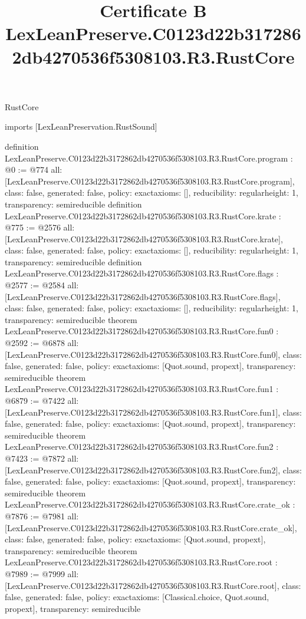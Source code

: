 \begin{lexlean}{RustCore}
\title{Certificate B LexLeanPreserve.C0123d22b3172862db4270536f5308103.R3.RustCore}
\begin{coremodule}
imports [LexLeanPreservation.RustSound]

definition LexLeanPreserve.C0123d22b3172862db4270536f5308103.R3.RustCore.program : @0 := @774 {
  all: [LexLeanPreserve.C0123d22b3172862db4270536f5308103.R3.RustCore.program],
  class: false,
  generated: false,
  policy: exact{axioms: []},
  reducibility: regular{height: 1},
  transparency: semireducible
}
definition LexLeanPreserve.C0123d22b3172862db4270536f5308103.R3.RustCore.krate : @775 := @2576 {
  all: [LexLeanPreserve.C0123d22b3172862db4270536f5308103.R3.RustCore.krate],
  class: false,
  generated: false,
  policy: exact{axioms: []},
  reducibility: regular{height: 1},
  transparency: semireducible
}
definition LexLeanPreserve.C0123d22b3172862db4270536f5308103.R3.RustCore.flags : @2577 := @2584 {
  all: [LexLeanPreserve.C0123d22b3172862db4270536f5308103.R3.RustCore.flags],
  class: false,
  generated: false,
  policy: exact{axioms: []},
  reducibility: regular{height: 1},
  transparency: semireducible
}
theorem LexLeanPreserve.C0123d22b3172862db4270536f5308103.R3.RustCore.fun0 : @2592 := @6878 {
  all: [LexLeanPreserve.C0123d22b3172862db4270536f5308103.R3.RustCore.fun0],
  class: false,
  generated: false,
  policy: exact{axioms: [Quot.sound, propext]},
  transparency: semireducible
}
theorem LexLeanPreserve.C0123d22b3172862db4270536f5308103.R3.RustCore.fun1 : @6879 := @7422 {
  all: [LexLeanPreserve.C0123d22b3172862db4270536f5308103.R3.RustCore.fun1],
  class: false,
  generated: false,
  policy: exact{axioms: [Quot.sound, propext]},
  transparency: semireducible
}
theorem LexLeanPreserve.C0123d22b3172862db4270536f5308103.R3.RustCore.fun2 : @7423 := @7872 {
  all: [LexLeanPreserve.C0123d22b3172862db4270536f5308103.R3.RustCore.fun2],
  class: false,
  generated: false,
  policy: exact{axioms: [Quot.sound, propext]},
  transparency: semireducible
}
theorem LexLeanPreserve.C0123d22b3172862db4270536f5308103.R3.RustCore.crate_ok : @7876 := @7981 {
  all: [LexLeanPreserve.C0123d22b3172862db4270536f5308103.R3.RustCore.crate_ok],
  class: false,
  generated: false,
  policy: exact{axioms: [Quot.sound, propext]},
  transparency: semireducible
}
theorem LexLeanPreserve.C0123d22b3172862db4270536f5308103.R3.RustCore.root : @7989 := @7999 {
  all: [LexLeanPreserve.C0123d22b3172862db4270536f5308103.R3.RustCore.root],
  class: false,
  generated: false,
  policy: exact{axioms: [Classical.choice, Quot.sound, propext]},
  transparency: semireducible
}


\end{coremodule}
\end{lexlean}
